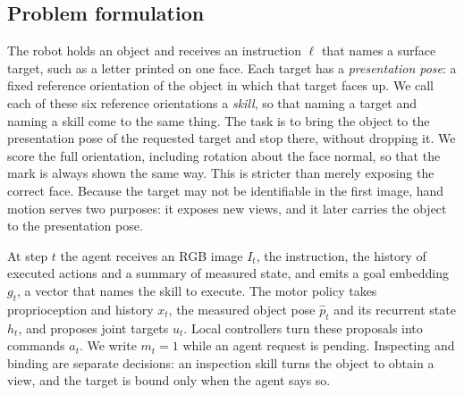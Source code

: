 \subsection{Problem formulation}
\label{sec:task}
The robot holds an object and receives an instruction $\ell$ that names a surface target, such as a letter printed on one face. Each target has a \emph{presentation pose}: a fixed reference orientation of the object in which that target faces up. We call each of these six reference orientations a \emph{skill}, so that naming a target and naming a skill come to the same thing. The task is to bring the object to the presentation pose of the requested target and stop there, without dropping it. We score the full orientation, including rotation about the face normal, so that the mark is always shown the same way. This is stricter than merely exposing the correct face. Because the target may not be identifiable in the first image, hand motion serves two purposes: it exposes new views, and it later carries the object to the presentation pose.

At step $t$ the agent receives an RGB image $I_t$, the instruction, the history of executed actions and a summary of measured state, and emits a goal embedding $g_t$, a vector that names the skill to execute. The motor policy takes proprioception and history $x_t$, the measured object pose $\hat p_t$ and its recurrent state $h_t$, and proposes joint targets $u_t$. Local controllers turn these proposals into commands $a_t$. We write $m_t=1$ while an agent request is pending. Inspecting and binding are separate decisions: an inspection skill turns the object to obtain a view, and the target is bound only when the agent says so.
